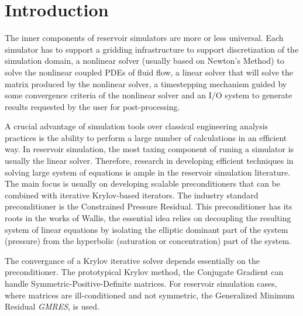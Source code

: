 \chapter{Introduction}
The inner components of reservoir simulators are more or less universal. Each simulator has to support a 
gridding infrastructure to support discretization of the simulation domain, a nonlinear solver (usually based on Newton's Method) to 
solve the nonlinear coupled PDEs of fluid flow, a linear solver that will solve the matrix produced by the nonlinear solver, a timestepping
mechanism guided by some convergence criteria of the nonlinear solver and an I/O system to generate results requested by the user for post-processing.

A crucial advantage of simulation tools over classical engineering analysis practices is the ability
to perform a large number of calculations in an efficient way. In reservoir simulation, the most taxing
component of runing a simulator is usually the linear solver. Therefore, research in developing efficient
techniques in solving large system of equations is ample in the reservoir simulation literature. The main
focus is usually on developing scalable preconditioners that can be combined with iterative Krylov-based 
iterators. The industry standard preconditioner is the Constrained Pressure Residual. This preconditioner
has its roots in the works of Wallis\supercite{Wallis_1983,Wallis_1985}, the essential idea relies on decoupling
the resulting system of linear equations by isolating the elliptic dominant part of the system (pressure) from 
the hyperbolic (saturation or concentration) part of the system. 

The convergance of a Krylov iterative solver depends essentially on the preconditioner. The prototypical Krylov method, the
Conjugate Gradient can handle Symmetric-Positive-Definite matrices. For reservoir simulation cases, where matrices are ill-conditioned and
not symmetric, the Generalized Minimum Residual \textit{GMRES}, is used\supercite{roy}. 



